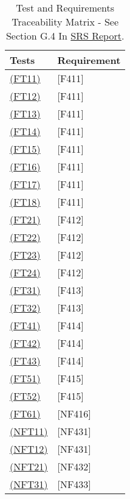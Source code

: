 \documentclass[12pt, titlepage]{article}
\begin{document}
\begin{table}[H]
  
  \centering
  \caption{Test and Requirements Traceability Matrix - See Section G.4 In \href{https://github.com/takhtart/PCD/blob/main/docs/SRS/SRS.pdf}{SRS Report}.}
  \begin{tabular}{|l|l|}
  \hline
  Tests   & Requirement \\
  \hline
  \hyperref[FT11]{(FT11)}  & {[}F411{]}  \\
  \hline
  \hyperref[FT12]{(FT12)}  & {[}F411{]}  \\
  \hline
  \hyperref[FT13]{(FT13)}  & {[}F411{]}  \\
  \hline
  \hyperref[FT14]{(FT14)} & {[}F411{]}  \\
  \hline
  \hyperref[FT15]{(FT15)}  & {[}F411{]}  \\
  \hline
  \hyperref[FT16]{(FT16)}  & {[}F411{]}  \\
  \hline
  \hyperref[FT17]{(FT17)}  & {[}F411{]}  \\
  \hline
  \hyperref[FT18]{(FT18)}  & {[}F411{]}  \\
  \hline
  \hyperref[FT21]{(FT21)}  & {[}F412{]}  \\
  \hline
  \hyperref[FT22]{(FT22)}  & {[}F412{]}  \\
  \hline
  \hyperref[FT23]{(FT23)}  & {[}F412{]}  \\
  \hline
  \hyperref[FT24]{(FT24)}  & {[}F412{]}  \\
  \hline
  \hyperref[FT31]{(FT31)}  & {[}F413{]}  \\
  \hline
  \hyperref[FT32]{(FT32)}  & {[}F413{]}  \\
  \hline
  \hyperref[FT41]{(FT41)}  & {[}F414{]}  \\
  \hline
  \hyperref[FT42]{(FT42)}  & {[}F414{]}  \\
  \hline
  \hyperref[FT43]{(FT43)}  & {[}F414{]}  \\
  \hline
  \hyperref[FT51]{(FT51)}  & {[}F415{]}  \\
  \hline
  \hyperref[FT52]{(FT52)}  & {[}F415{]}  \\
  \hline
  \hyperref[FT61]{(FT61)} & {[}NF416{]} \\
  \hline
  \hyperref[NFT11]{(NFT11)} & {[}NF431{]} \\
  \hline
  \hyperref[NFT12]{(NFT12)} & {[}NF431{]} \\ 
  \hline
  \hyperref[NFT21]{(NFT21)} & {[}NF432{]} \\
  \hline
  \hyperref[NFT31]{(NFT31)} & {[}NF433{]} \\ 
  \hline
  \end{tabular}
  \end{table}
\end{document}
